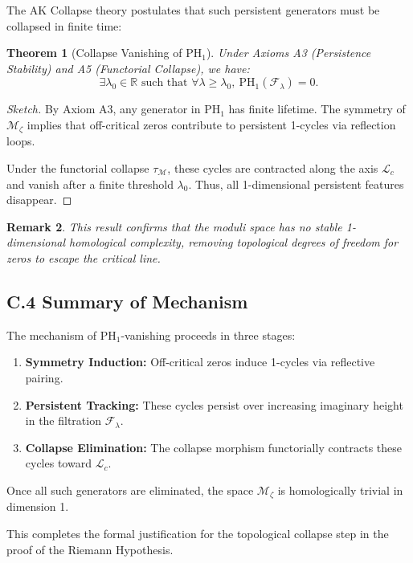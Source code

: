 \documentclass[11pt]{article}
\newtheorem{theorem}{Theorem}[section]
\newtheorem{remark}[theorem]{Remark}
\begin{document}
The AK Collapse theory postulates that such persistent generators must be collapsed in finite time:

\begin{theorem}[Collapse Vanishing of PH$_1$]
Under Axioms A3 (Persistence Stability) and A5 (Functorial Collapse), we have:
\[
\exists \lambda_0 \in \mathbb{R} \text{ such that } \forall \lambda \geq \lambda_0,\ \mathrm{PH}_1(\mathcal{F}_\lambda) = 0.
\]
\end{theorem}

\begin{proof}[Sketch]
By Axiom A3, any generator in $\mathrm{PH}_1$ has finite lifetime.  
The symmetry of $\mathcal{M}_\zeta$ implies that off-critical zeros contribute to persistent 1-cycles via reflection loops.

Under the functorial collapse $\tau_{\mathcal{M}}$, these cycles are contracted along the axis $\mathcal{L}_c$  
and vanish after a finite threshold $\lambda_0$.  
Thus, all 1-dimensional persistent features disappear.
\end{proof}

\begin{remark}
This result confirms that the moduli space has no stable 1-dimensional homological complexity,  
removing topological degrees of freedom for zeros to escape the critical line.
\end{remark}

\subsection*{C.4 Summary of Mechanism}

The mechanism of $\mathrm{PH}_1$-vanishing proceeds in three stages:

\begin{enumerate}
    \item \textbf{Symmetry Induction:} Off-critical zeros induce 1-cycles via reflective pairing.
    \item \textbf{Persistent Tracking:} These cycles persist over increasing imaginary height in the filtration $\mathcal{F}_\lambda$.
    \item \textbf{Collapse Elimination:} The collapse morphism functorially contracts these cycles toward $\mathcal{L}_c$.
\end{enumerate}

Once all such generators are eliminated, the space $\mathcal{M}_\zeta$ is homologically trivial in dimension 1.

This completes the formal justification for the topological collapse step in the proof of the Riemann Hypothesis.
\end{document}
